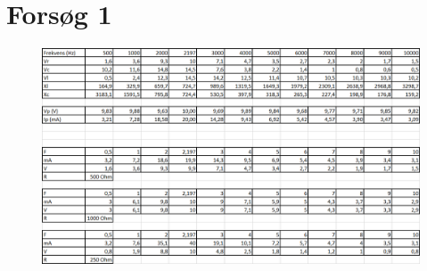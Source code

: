 \chapter{Forsøg 1} \label{bilag:forsg1}

\begin{figure}[H]
\centering
\includegraphics[width=1\textwidth]{Setup/Bilag_forsg1}
\label{tabular:forsg1}
\end{figure}